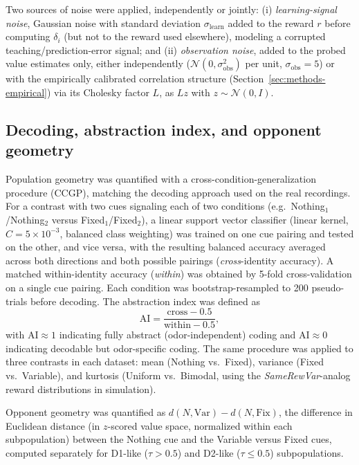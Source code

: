 \documentclass[11pt]{article}
\begin{document}
Two sources of noise were applied, independently or jointly: (i) \emph{learning-signal noise}, Gaussian noise with standard deviation $\sigma_{\mathrm{learn}}$ added to the reward $r$ before computing $\delta_i$ (but not to the reward used elsewhere), modeling a corrupted teaching/prediction-error signal; and (ii) \emph{observation noise}, added to the probed value estimates only, either independently ($\mathcal{N}(0, \sigma_{\mathrm{obs}}^2)$ per unit, $\sigma_{\mathrm{obs}} = 5$) or with the empirically calibrated correlation structure (Section~\ref{sec:methods-empirical}) via its Cholesky factor $L$, as $L z$ with $z \sim \mathcal{N}(0, I)$.

\subsection{Decoding, abstraction index, and opponent geometry}
\label{sec:methods-decoding}

Population geometry was quantified with a cross-condition-generalization procedure (CCGP), matching the decoding approach used on the real recordings. For a contrast with two cues signaling each of two conditions (e.g.\ Nothing$_1$/Nothing$_2$ versus Fixed$_1$/Fixed$_2$), a linear support vector classifier (linear kernel, $C=5\times10^{-3}$, balanced class weighting) was trained on one cue pairing and tested on the other, and vice versa, with the resulting balanced accuracy averaged across both directions and both possible pairings (\emph{cross}-identity accuracy). A matched within-identity accuracy (\emph{within}) was obtained by 5-fold cross-validation on a single cue pairing. Each condition was bootstrap-resampled to 200 pseudo-trials before decoding. The abstraction index was defined as
\begin{equation}
    \mathrm{AI} = \frac{\mathrm{cross} - 0.5}{\mathrm{within} - 0.5},
\end{equation}
with $\mathrm{AI} \approx 1$ indicating fully abstract (odor-independent) coding and $\mathrm{AI} \approx 0$ indicating decodable but odor-specific coding. The same procedure was applied to three contrasts in each dataset: mean (Nothing vs.\ Fixed), variance (Fixed vs.\ Variable), and kurtosis (Uniform vs.\ Bimodal, using the \emph{SameRewVar}-analog reward distributions in simulation).

Opponent geometry was quantified as $d(N,\mathrm{Var}) - d(N,\mathrm{Fix})$, the difference in Euclidean distance (in $z$-scored value space, normalized within each subpopulation) between the Nothing cue and the Variable versus Fixed cues, computed separately for D1-like ($\tau>0.5$) and D2-like ($\tau\le0.5$) subpopulations.
\end{document}
